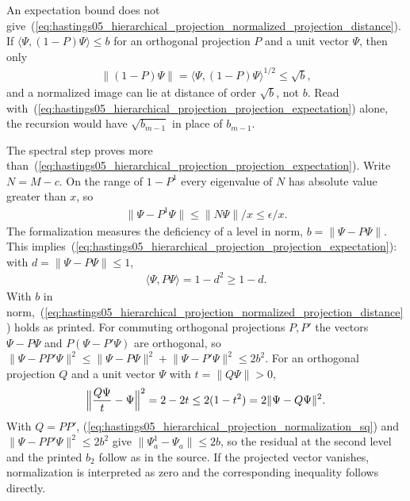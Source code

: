 \documentclass{article}
\begin{document}
An expectation bound does not give~(\ref{eq:hastings05_hierarchical_projection_normalized_projection_distance}). If
$\langle\Psi,(1-P)\Psi\rangle\le b$ for an orthogonal projection $P$ and a unit
vector $\Psi$, then only
\begin{align}\label{eq:hastings05_hierarchical_projection_sqrt_deficiency}
    \lVert(1-P)\Psi\rVert=\langle\Psi,(1-P)\Psi\rangle^{1/2}\le\sqrt b ,
\end{align}
and a normalized image can lie at distance of order $\sqrt b$, not $b$. Read
with~(\ref{eq:hastings05_hierarchical_projection_projection_expectation}) alone, the recursion would have $\sqrt{b_{m-1}}$ in
place of $b_{m-1}$.

The spectral step proves more than~(\ref{eq:hastings05_hierarchical_projection_projection_expectation}). Write
$N=M-c$. On the range of $1-P^1$ every eigenvalue of $N$ has absolute value
greater than $x$, so
\begin{align}\label{eq:hastings05_hierarchical_projection_projection_residual}
    \lVert\Psi-P^1\Psi\rVert\le\lVert N\Psi\rVert/x\le\epsilon/x .
\end{align}
The formalization measures the deficiency of a level in norm,
$b=\lVert\Psi-P\Psi\rVert$. This implies~(\ref{eq:hastings05_hierarchical_projection_projection_expectation}): with
$d=\lVert\Psi-P\Psi\rVert\le1$,
\begin{align}\label{eq:hastings05_hierarchical_projection_expectation_norm}
    \langle\Psi,P\Psi\rangle=1-d^2\ge1-d .
\end{align}
With $b$ in norm,~(\ref{eq:hastings05_hierarchical_projection_normalized_projection_distance}) holds as printed. For commuting
orthogonal projections $P,P'$ the vectors $\Psi-P\Psi$ and $P(\Psi-P'\Psi)$
are orthogonal, so
$\lVert\Psi-PP'\Psi\rVert^2\le\lVert\Psi-P\Psi\rVert^2+\lVert\Psi-P'\Psi\rVert^2\le2b^2$.
For an orthogonal projection $Q$ and a unit vector $\Psi$ with
$t=\lVert Q\Psi\rVert>0$,
\begin{align}\label{eq:hastings05_hierarchical_projection_normalization_sq}
    \Bigl\lVert\frac{Q\Psi}{t}-\Psi\Bigr\rVert^2=2-2t\le2(1-t^2)
    =2\lVert\Psi-Q\Psi\rVert^2 .
\end{align}
With $Q=PP'$, (\ref{eq:hastings05_hierarchical_projection_normalization_sq}) and
$\lVert\Psi-PP'\Psi\rVert^2\le2b^2$ give
$\lVert\Psi^1_a-\Psi_a\rVert\le2b$, so
the residual at the second level and the printed $b_2$ follow as in the
source. If the projected vector vanishes, normalization is interpreted as
zero and the corresponding inequality follows directly.
\end{document}

